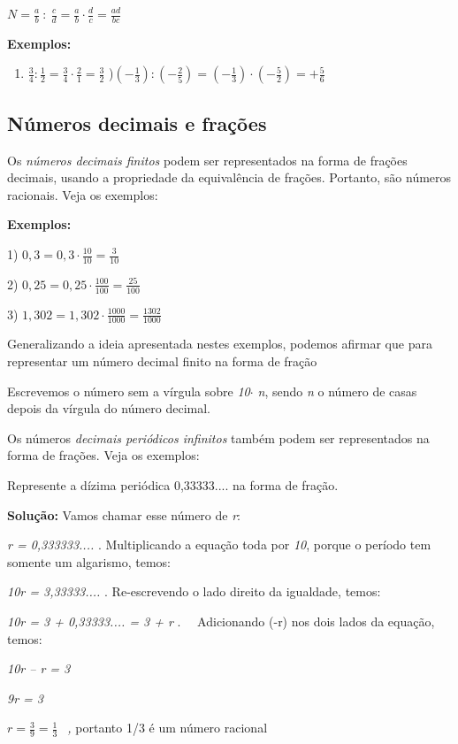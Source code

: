 \quad  \( N=\frac{a}{b}~:~\frac{c}{d}= \frac{a}{b} \cdot  \frac{d}{c} =\frac{ad}{bc}~ \) ~~~ \qedsymbol{}\quad 

\textbf{Exemplos:}

\begin{enumerate}
	\item  \( \frac{3}{4}:\frac{1}{2}=\frac{3}{4} \cdot \frac{2}{1}=\frac{3}{2} \) \quad {})\(  \left( -\frac{1}{3} \right) : \left( -\frac{2}{5} \right) = \left( -\frac{1}{3} \right)  \cdot  \left( -\frac{5}{2} \right) =+\frac{5}{6} \)
\end{enumerate}

\subsection{Números decimais e frações }

Os \textit{números decimais finitos} podem ser representados na forma de frações decimais, usando a propriedade da equivalência de frações. Portanto, são números racionais. Veja os exemplos:

\textbf{Exemplos:}

1)  \( 0,3=0,3 \cdot \frac{10}{10}=\frac{3}{10}~~ \) \quad \quad \quad \quad 

2)  \( 0,25=0,25 \cdot \frac{100}{100}=\frac{25}{100}~~ \)  \quad \quad \quad \quad 

3)  \( 1,302=1,302 \cdot \frac{1000}{1000}=\frac{1302}{1000}~~ \) ~~~~ 

Generalizando a ideia apresentada nestes exemplos, podemos afirmar que para representar um número decimal finito na forma de fração

\begin{caixa}
\begin{Center}
Escrevemos o número sem a vírgula sobre \textit{10$ \cdot $ n}, sendo \textit{n} o número de casas depois da vírgula do número decimal.
\end{Center}
\end{caixa}

Os números \textit{decimais periódicos infinitos} também podem ser representados na forma de frações. Veja os exemplos:

\begin{texemplo}
Represente a dízima periódica 0,33333.... na forma de fração.

\textbf{Solução: }Vamos chamar esse número de \textit{r}:

\quad \textit{r = 0,333333....} . Multiplicando a equação toda por \textit{10}, porque o período tem somente um algarismo, temos:

\quad \textit{10r = 3,33333....} . Re-escrevendo o lado direito da igualdade, temos:

\quad \textit{10r = 3 + 0,33333.... = 3 + r} .~~ Adicionando (-r) nos dois lados da equação, temos:

\quad \textit{10r – r = 3}

\quad \textit{9r = 3}

\quad  \( r=\frac{3}{9}=\frac{1}{3}~~ \) \textit{, }portanto 1/3 é um número racional\textit{ \qedsymbol{}}

\end{texemplo}

